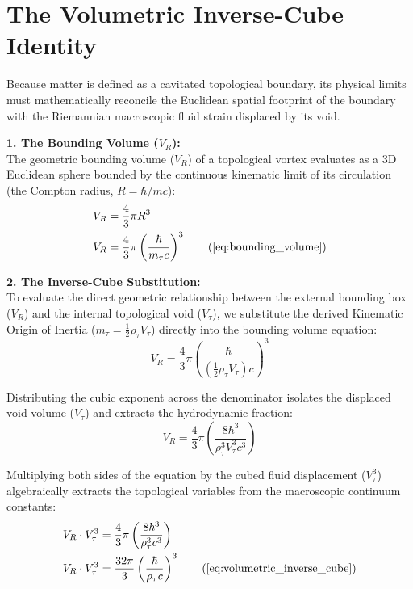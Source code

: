 \documentclass[11pt, a4paper]{article}
\begin{document}
\section{The Volumetric Inverse-Cube Identity}
\label{sec:deriv_volumetric_inverse_cube}

Because matter is defined as a cavitated topological boundary, its physical limits must mathematically reconcile the Euclidean spatial footprint of the boundary with the Riemannian macroscopic fluid strain displaced by its void. 

\textbf{1. The Bounding Volume ($V_R$):} \\
The geometric bounding volume ($V_R$) of a topological vortex evaluates as a 3D Euclidean sphere bounded by the continuous kinematic limit of its circulation (the Compton radius, $R = \hbar/mc$):
\begin{align}
    V_R &= \frac{4}{3}\pi R^3 \nonumber \\
    V_R &= \frac{4}{3}\pi \left( \frac{\hbar}{m_\tau c} \right)^3 \tag{\ref{eq:bounding_volume}}
\end{align}

\textbf{2. The Inverse-Cube Substitution:} \\
To evaluate the direct geometric relationship between the external bounding box ($V_R$) and the internal topological void ($V_{\tau}$), we substitute the derived Kinematic Origin of Inertia ($m_\tau = \frac{1}{2} \rho_{\tau} V_{\tau}$) directly into the bounding volume equation:
\begin{equation}
    V_R = \frac{4}{3}\pi \left( \frac{\hbar}{(\frac{1}{2}\rho_{\tau} V_{\tau}) c} \right)^3 
\end{equation}

Distributing the cubic exponent across the denominator isolates the displaced void volume ($V_{\tau}$) and extracts the hydrodynamic fraction:
\begin{equation}
    V_R = \frac{4}{3}\pi \left( \frac{8\hbar^3}{\rho_{\tau}^3 V_{\tau}^3 c^3} \right) 
\end{equation}

Multiplying both sides of the equation by the cubed fluid displacement ($V_{\tau}^3$) algebraically extracts the topological variables from the macroscopic continuum constants:
\begin{align}
    V_R \cdot V_{\tau}^3 &= \frac{4}{3}\pi \left( \frac{8\hbar^3}{\rho_{\tau}^3 c^3} \right)  \\
    V_R \cdot V_{\tau}^3 &= \frac{32\pi}{3} \left( \frac{\hbar}{\rho_{\tau} c} \right)^3 \tag{\ref{eq:volumetric_inverse_cube}}
\end{align}
\end{document}
